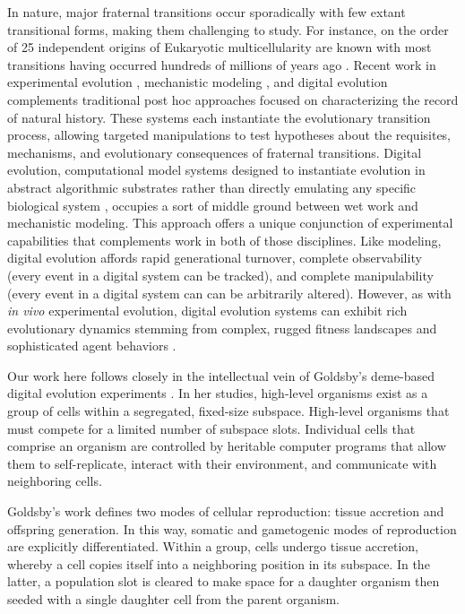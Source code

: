 In nature, major fraternal transitions occur sporadically with few extant transitional forms, making them challenging to study.
For instance, on the order of 25 independent origins of Eukaryotic multicellularity are known \citep{grosberg2007evolution} with most transitions having occurred hundreds of millions of years ago \citep{libby2014ratcheting}.
Recent work in experimental evolution \citep{ratcliff2014experimental, ratcliff2015origins, gulli2019evolution, koschwanez2013improved}, mechanistic modeling \citep{hanschen2015evolutionary, staps2019emergence}, and digital evolution \citep{goldsby2012task, goldsby2014evolutionary} complements traditional post hoc approaches focused on characterizing the record of natural history.
These systems each instantiate the evolutionary transition process, allowing targeted manipulations to test hypotheses about the requisites, mechanisms, and evolutionary consequences of fraternal transitions.
Digital evolution, computational model systems designed to instantiate evolution in abstract algorithmic substrates rather than directly emulating any specific biological system \citep{wilke2002biology,dolsondigital2022}, occupies a sort of middle ground between wet work and mechanistic modeling.
This approach offers a unique conjunction of experimental capabilities that complements work in both of those disciplines.
Like modeling, digital evolution affords rapid generational turnover, complete observability (every event in a digital system can be tracked), and complete manipulability (every event in a digital system can can be arbitrarily altered).
However, as with \textit{in vivo} experimental evolution, digital evolution systems can exhibit rich evolutionary dynamics stemming from complex, rugged fitness landscapes \citep{labar2017evolution} and sophisticated agent behaviors \citep{grabowski2013case}.

Our work here follows closely in the intellectual vein of Goldsby's deme-based digital evolution experiments \citep{goldsby2012task, goldsby2014evolutionary}.
In her studies, high-level organisms exist as a group of cells within a segregated, fixed-size subspace.
High-level organisms that must compete for a limited number of subspace slots.
Individual cells that comprise an organism are controlled by heritable computer programs that allow them to self-replicate, interact with their environment, and communicate with neighboring cells.

Goldsby's work defines two modes of cellular reproduction: tissue accretion and offspring generation.
In this way, somatic and gametogenic modes of reproduction are explicitly differentiated.
Within a group, cells undergo tissue accretion, whereby a cell copies itself into a neighboring position in its subspace.
In the latter, a population slot is cleared to make space for a daughter organism then seeded with a single daughter cell from the parent organism.

